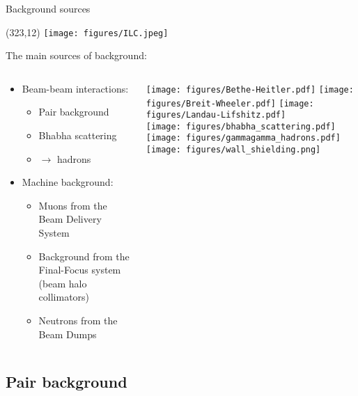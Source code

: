 \documentclass[xcolor={dvipsnames}]{beamer}
\newcommand{\ilclogo}{
  \setlength{\TPHorizModule}{1pt}
  \setlength{\TPVertModule}{1pt}
  \begin{textblock}{1}(323,12)
   \texttt{[image: figures/ILC.jpeg]}
  \end{textblock}
}
\begin{document}
\begin{frame}{Background sources}
\ilclogo
The main sources of background:
\begin{columns}
 \begin{column}{0.6\textwidth}
  \begin{itemize}
    \item Beam-beam interactions:
    \begin{itemize}
      \item Pair background
      \item Bhabha scattering
      \item \textgamma \textgamma $\rightarrow$ hadrons
    \end{itemize}
    \vspace*{0.5cm}
    \item Machine background:
    \begin{itemize}
      \item Muons from the Beam Delivery System
      \item Background from the Final-Focus system (beam halo collimators)
      \item Neutrons from the Beam Dumps
    \end{itemize}
  \end{itemize}
 \end{column}
 \begin{column}{0.45\textwidth}
 \texttt{[image: figures/Bethe-Heitler.pdf]}
 \texttt{[image: figures/Breit-Wheeler.pdf]}
 \texttt{[image: figures/Landau-Lifshitz.pdf]}\\
 \texttt{[image: figures/bhabha\_scattering.pdf]} 
 \texttt{[image: figures/gammagamma\_hadrons.pdf]}\\
 \vspace*{0.5cm}
 \texttt{[image: figures/wall\_shielding.png]}
 \end{column}
\end{columns}
\end{frame}

\subsection{Pair background}
\end{document}
